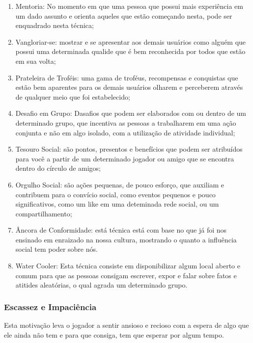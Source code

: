 \begin{enumerate}
    \item Mentoria: No momento em que uma pessoa que possui mais experiência
        em um dado assunto e orienta aqueles que estão começando nesta, pode
        ser enquadrado nesta técnica;
    \item Vangloriar-se: mostrar e se apresentar aos demais usuários como
        alguém que possui uma determinada qualide que é bem reconhecida
        por todos que estão em sua volta;
    \item Prateleira de Troféis: uma gama de troféus, recompensas e conquistas
        que estão bem aparentes para os demais usuários olharem e perceberem
        através de qualquer meio que foi estabelecido;
    \item Desafio em Grupo: Dasafios que podem ser elaborados com ou dentro
        de um determinado grupo, que incentiva as pessoas a trabalharem
        em uma ação conjunta e não em algo isolado, com a utilização de atividade
        individual;
    \item Tesouro Social: são pontos, presentos e benefícios que podem ser atribuídos
        para você a partir de um determinado jogador ou amigo que se encontra dentro
        do círculo de amigos;
    \item Orgulho Social:  são ações pequenas, de pouco esforço, que auxiliam e contribuem
        para o convício social, como eventos pequenos e pouco significativos,
        como um like em uma deteminada rede social, ou um compartilhamento;
    \item Âncora de Conformidade: está técnica está com base no que já
        foi nos ensinado em enraizado na nossa cultura, mostrando o quanto a
        influência social tem poder sobre nós.
    \item Water Cooler: Esta técnica consiste em disponibilizar algum local
        aberto e comum para que as pessoas consigam escrever, expor e falar
        sobre fatos e atitides aleatórias, o qual agrada um determinado grupo.

\end{enumerate}

\subsubsection{Escassez e Impaciência}
\label{sub:escassexeimpaciencia}
Esta motivação leva o jogador a sentir ansioso e recioso com a espera de algo
que ele ainda não tem e para que consiga, tem que esperar por algum tempo.


